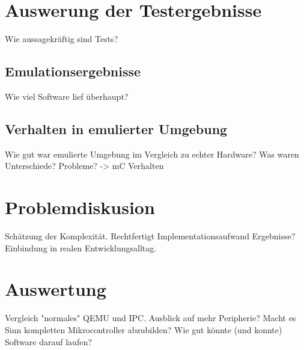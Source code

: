 \section{Auswerung der Testergebnisse}
Wie aussagekräftig sind Tests?

\subsection{Emulationsergebnisse}
Wie viel Software lief überhaupt?

\subsection{Verhalten in emulierter Umgebung}
Wie gut war emulierte Umgebung im Vergleich zu echter Hardware?
Was waren Unterschiede?
Probleme? -> mC Verhalten

\section{Problemdiskusion}
Schätzung der Komplexität.
Rechtfertigt Implementationsaufwand Ergebnisse?
Einbindung in realen Entwicklungsalltag.

\section{Auswertung}
Vergleich "normales" QEMU und IPC.
Ausblick auf mehr Peripherie?
Macht es Sinn kompletten Mikrocontroller abzubilden?
Wie gut könnte (und konnte) Software darauf laufen?
